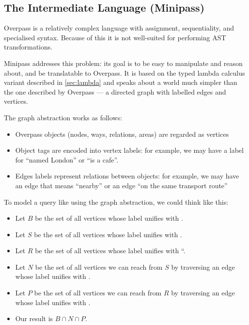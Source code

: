 \documentclass[main.tex]{subfiles}
\begin{document}
\subsection{The Intermediate Language (Minipass)}
\label{sec:minipass}
Overpass is a relatively complex language with assignment, sequentiality,
and specialised syntax. Because of this it is not well-suited for performing
AST transformations.

Minipass addresses this problem: its goal is to be easy to manipulate
and reason about, and be translatable to Overpass. It is based on the typed
lambda calculus variant described in \cref{sec:lambda} and speaks about a
world much simpler than the one described by Overpass --- a directed graph
with labelled edges and vertices.

The graph abstraction works as follows:
\begin{itemize}
    \item Overpass objects (nodes, ways, relations, areas) are regarded as
        vertices
    \item Object tags are encoded into vertex labels: for example, we
        may have a label for ``named London'' or ``is a cafe''.
    \item Edges labels represent relations between objects: for example,
        we may have an edge that means ``nearby'' or an edge ``on the same
        transport route''
\end{itemize}

\begin{example}
    To model a query like 
    using the graph abstraction, we could think like this:
    \begin{itemize}
        \item Let $B$ be the set of all vertices whose label unifies with
            .
        \item Let $S$ be the set of all vertices whose label unifies with
            .
        \item Let $R$ be the set of all vertices whose label unifies with
            ``.
        \item Let $N$ be the set of all vertices we can reach from $S$
            by traversing an edge whose label unifies with .
        \item Let $P$ be the set of all vertices we can reach from $R$
            by traversing an edge whose label unifies with .
        \item Our result is $B \cap N \cap P$.
    \end{itemize}
\end{example}
\end{document}
